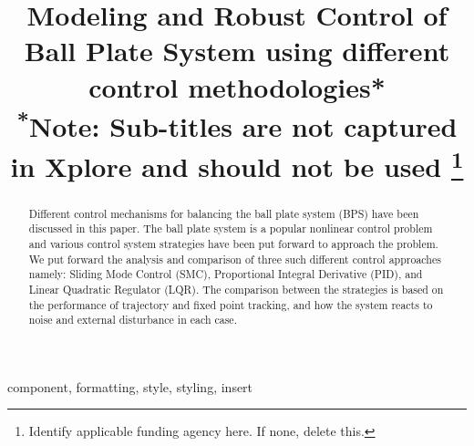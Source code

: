 \documentclass[conference]{IEEEtran}
\begin{document}
\title{Modeling and Robust Control of Ball Plate System using different control methodologies*\\
{\footnotesize \textsuperscript{*}Note: Sub-titles are not captured in Xplore and
should not be used}
\thanks{Identify applicable funding agency here. If none, delete this.}
}

\author{
\and
{}
}
\maketitle

\begin{abstract}
Different control mechanisms for balancing the ball plate system (BPS)  have been discussed in this paper. The ball plate system is a popular nonlinear control problem and various control system strategies have been put forward to approach the problem. We put forward the analysis and comparison of three such different control approaches namely: Sliding Mode Control (SMC), Proportional Integral Derivative (PID), and Linear Quadratic Regulator (LQR). The comparison between the strategies is based on the performance of trajectory and fixed point tracking, and how the system reacts to noise and external disturbance in each case.
\end{abstract}

\begin{IEEEkeywords}
component, formatting, style, styling, insert
\end{IEEEkeywords}
\end{document}
